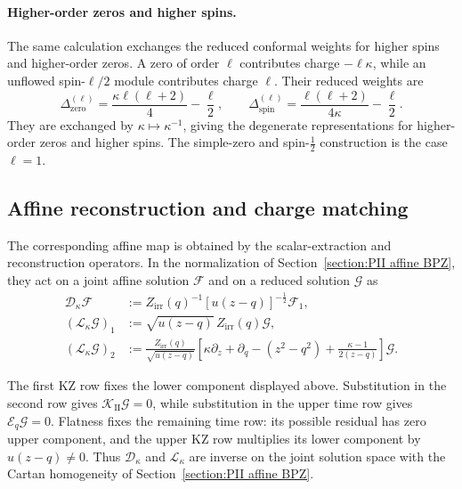 \documentclass[a4paper,11pt]{article}
\numberwithin{equation}{section}
\begin{document}
\paragraph*{Higher-order zeros and higher spins.}
The same calculation exchanges the reduced conformal weights for
higher spins and higher-order zeros.  A zero of order $\ell$ contributes charge
$-\ell\kappa$, while an unflowed spin-$\ell/2$ module contributes
charge $\ell$.  Their reduced weights are
\begin{equation}
	\Delta_{\mathrm{zero}}^{(\ell)}
	=\frac{\kappa\ell(\ell+2)}{4}-\frac{\ell}{2},
	\qquad
	\Delta_{\mathrm{spin}}^{(\ell)}
	=\frac{\ell(\ell+2)}{4\kappa}-\frac{\ell}{2}.
\end{equation}
They are exchanged by $\kappa\mapsto\kappa^{-1}$, giving the
degenerate representations for higher-order zeros and
higher spins.  The simple-zero and spin-$\frac{1}{2}$ construction
is the case $\ell=1$.

\subsection{Affine reconstruction and charge matching}
\label{appendix:PII affine reconstruction verification}

The corresponding affine map is obtained by the scalar-extraction
and reconstruction operators.  In the normalization of
Section~\ref{section:PII affine BPZ}, they act on a joint affine
solution $\mathcal{F}$ and on a reduced solution $\mathcal{G}$ as
\begin{equation}
	\begin{aligned}
		\mathscr{D}_{\kappa}\mathcal{F}
		&:=Z_{\mathrm{irr}}(q)^{-1}
		[u(z-q)]^{-\frac{1}{2}}\mathcal{F}_{1},\\
		(\mathscr{L}_{\kappa}\mathcal{G})_{1}
		&:=\sqrt{u(z-q)}\,Z_{\mathrm{irr}}(q)\mathcal{G},\\
		(\mathscr{L}_{\kappa}\mathcal{G})_{2}
		&:=\frac{Z_{\mathrm{irr}}(q)}{\sqrt{u(z-q)}}
		\left[\kappa\partial_{z}+\partial_{q}
		-(z^{2}-q^{2})+\frac{\kappa-1}{2(z-q)}\right]
		\mathcal{G}.
	\end{aligned}
\end{equation}

The first KZ row fixes the lower component displayed above.
Substitution in the second row gives
$\mathcal{K}_{\mathrm{II}}\mathcal{G}=0$, while substitution in the
upper time row gives $\mathcal{E}_{q}\mathcal{G}=0$.  Flatness fixes
the remaining time row: its possible residual has zero upper component,
and the upper KZ row multiplies its lower component by
$u(z-q)\neq0$.  Thus $\mathscr{D}_{\kappa}$ and
$\mathscr{L}_{\kappa}$ are inverse on the joint solution space with
the Cartan homogeneity of Section~\ref{section:PII affine BPZ}.
\end{document}
